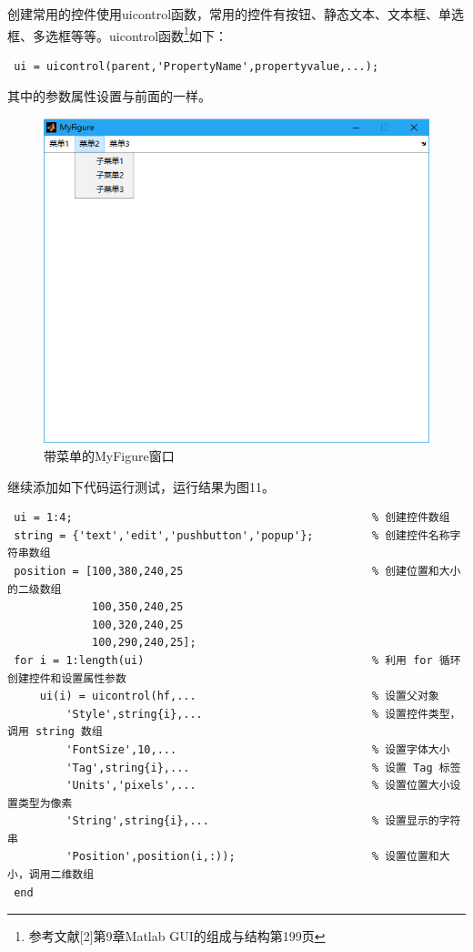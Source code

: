 \begin{enumerate}
	\qquad 创建常用的控件使用uicontrol函数，常用的控件有按钮、静态文本、文本框、单选框、多选框等等。uicontrol函数\footnote{参考文献[2]第9章Matlab GUI的组成与结构第199页}如下：
	\begin{lstlisting}
 ui = uicontrol(parent,'PropertyName',propertyvalue,...);\end{lstlisting}
 	其中的参数属性设置与前面的一样。
	\begin{figure}[H]
		\centering
		\includegraphics[scale=0.35]{MyFigure_uimenu}
		\caption{带菜单的MyFigure窗口}
	\end{figure}
	继续添加如下代码运行测试，运行结果为图11。
	\begin{lstlisting}
 ui = 1:4;												% 创建控件数组
 string = {'text','edit','pushbutton','popup'};			% 创建控件名称字符串数组
 position = [100,380,240,25								% 创建位置和大小的二级数组
             100,350,240,25
 			 100,320,240,25
             100,290,240,25];
 for i = 1:length(ui)									% 利用 for 循环创建控件和设置属性参数
     ui(i) = uicontrol(hf,...							% 设置父对象
         'Style',string{i},...							% 设置控件类型，调用 string 数组
         'FontSize',10,...								% 设置字体大小
		 'Tag',string{i},...							% 设置 Tag 标签
         'Units','pixels',...							% 设置位置大小设置类型为像素
         'String',string{i},...							% 设置显示的字符串
         'Position',position(i,:));						% 设置位置和大小，调用二维数组
 end\end{lstlisting}
 	\begin{figure}[H]
		\centering

\end{figure}
\end{enumerate}
